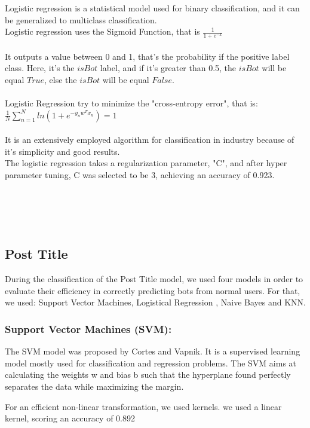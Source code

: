 \documentclass{article}
\begin{document}
    Logistic regression is a statistical model used for binary classification, and it can be generalized to multiclass classification. \\
Logistic regression uses the Sigmoid Function, that is $\frac{1}{1+e^{-x}}$\\ \\ It outputs a value between 0 and 1, that's the probability if the positive label class. Here, it's the $isBot$ label, and if it's greater than 0.5, the $isBot$ will be equal $True$, else the $isBot$ will be equal $False$.  \\ \\
Logistic Regression try to minimize the "cross-entropy error", that is:\\ $\frac{1}{N} \sum_{n=1}^{N} ln(1 + e^ {-y_{n}w^Tx_n}) = 1$\\ \\
It is an extensively employed algorithm for classification in industry because of it's simplicity and good results. \\
The logistic regression takes a regularization parameter, "C", and after hyper parameter tuning, C was selected to be 3, achieving an accuracy of 0.923.  \\ \\ \\ \\ \\ 
        
    \subsection{Post Title}      
    During the classification of  the Post Title model, we used four models in order to evaluate their efficiency in correctly predicting bots from normal users. For that, we used:         Support Vector Machines, Logistical Regression , Naive Bayes and KNN.
    
    \subsubsection{Support Vector Machines (SVM):}
    
    The SVM model was proposed by Cortes and Vapnik. It is a supervised learning model mostly used for classification and regression problems. The SVM aims at calculating the weights w and bias b such that the hyperplane found perfectly separates the data while maximizing the margin.
    
    For an efficient non-linear transformation, we used kernels.
we used a linear kernel, scoring an accuracy of 0.892       
\end{document}
